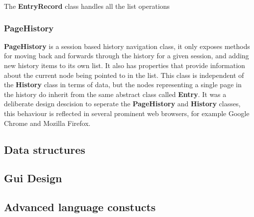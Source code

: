 \documentclass[../Main.tex]{subfiles}
\begin{document}
The \textbf{EntryRecord} class handles all the list operations 



\subsubsection{PageHistory}
\textbf{PageHistory} is a session based history navigation class, it only exposes methods for moving back and forwards through the history for a given session, and adding new history items to its own list. It also has properties that provide information about the current node being pointed to in the list. This class is independent of the \textbf{History} class in terms of data, but the nodes representing a single page in the history do inherit from the same abstract class called \textbf{Entry}. It was a deliberate design descision to seperate the \textbf{PageHistory} and \textbf{History} classes, this behaviour is reflected in several prominent web browsers, for example Google Chrome and Mozilla Firefox.


\subsection{Data structures}

\subsection{Gui Design}

\subsection{Advanced language constucts}
\end{document}

